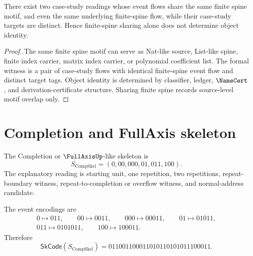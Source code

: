 \begin{theorem}
\label{thm:case-studies-same-spine-not-same-object}
There exist two case-study readings whose event flows share the same finite spine motif, and even the same underlying finite-spine flow, while their case-study targets are distinct. Hence finite-spine sharing alone does not determine object identity.
\end{theorem}

\begin{proof}
The same finite spine motif can serve as Nat-like source, List-like spine, finite index carrier, matrix index carrier, or polynomial coefficient list. The formal witness is a pair of case-study flows with identical finite-spine event flow and distinct target tags. Object identity is determined by classifier, ledger, $\NameCert$, and derivation-certificate structure. Sharing finite spine records source-level motif overlap only.
\end{proof}

\section{Completion and FullAxis skeleton}
\label{sec:case-studies-completion}

\begin{definition}
\label{def:case-studies-completion-skeleton}
The Completion or $\FullAxisUp$-like skeleton is
$$
  S_{\mathrm{CompSkel}}
  =
  (0,00,000,01,011,100).
$$
The explanatory reading is starting unit, one repetition, two repetitions, repeat-boundary witness, repeat-to-completion or overflow witness, and normal-address candidate.
\end{definition}

\begin{example}
\label{ex:case-studies-completion-code}
The event encodings are
$$
\begin{gathered}
  0\mapsto 011,\qquad
  00\mapsto 0011,\qquad
  000\mapsto 00011,\qquad
  01\mapsto 01011,\\
  011\mapsto 0101011,\qquad
  100\mapsto 100011.
\end{gathered}
$$
Therefore
$$
  \mathsf{SkCode}(S_{\mathrm{CompSkel}})
  =
  011001100011010110101011100011.
$$
\end{example}

